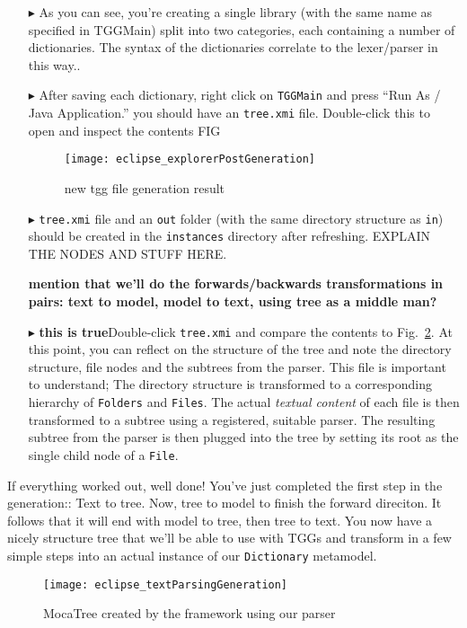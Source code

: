 \begin{enumerate}

\item[$\blacktriangleright$] As you can see, you're creating a single library (with the same name as specified in TGGMain) split into two categories, each
containing a number of dictionaries. The syntax of the dictionaries correlate to the lexer/parser in this way..

\item[$\blacktriangleright$] After saving each dictionary, right click on \texttt{TGGMain} and press ``Run As / Java Application.''  you should have an
\texttt{tree.xmi} file. Double-click this to open and inspect the contents FIG

\begin{figure}[!htbp]
\begin{center}
 \texttt{[image: eclipse\_explorerPostGeneration]}
  \caption{new tgg file generation result}
  \label{eclipse_postParse}
\end{center}
\end{figure} 

\item[$\blacktriangleright$] \texttt{tree.xmi} file and an \texttt{out} folder (with the same directory structure as \texttt{in}) should be created in the
\texttt{instances} directory after refreshing. EXPLAIN THE NODES AND STUFF HERE.

{\bf mention that we'll do the forwards/backwards transformations in pairs: text to model, model to text, using tree as a middle man?}

\item[$\blacktriangleright$] {\bf this is true}Double-click \texttt{tree.xmi} and compare the contents to Fig.~\ref{eclipse:treeResult}. At this point, you can
reflect on the structure of the tree and note the directory structure, file nodes and the subtrees from the parser. This file is important to understand; The directory
structure is transformed to a corresponding hierarchy of \texttt{Folders} and \texttt{Files}. The actual \emph{textual content} of each file is then transformed
to a subtree using a registered, suitable parser. The resulting subtree from the parser is then plugged into the tree by setting its root as the single child
node of a \texttt{File}.

\end{enumerate}

If everything worked out, well done! You've just completed the first step in the generation:: Text to tree. Now, tree to model to finish the forward
direciton. It follows that it will end with model to tree, then tree to text. You now have a nicely structure tree that we'll be able to use with TGGs and
transform in a few simple steps into an actual instance of our \texttt{Dictionary} metamodel.

\newpage

\vspace*{2cm}

\begin{figure}[!htbp]
\begin{center}
 \texttt{[image: eclipse\_textParsingGeneration]}
  \caption{MocaTree created by the framework using our parser}
  \label{eclipse:treeResult}
\end{center}
\end{figure}

